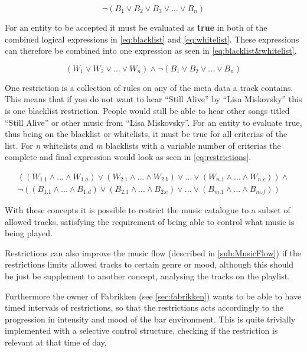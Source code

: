 \begin{equation}
\label{eq:blacklist}
	\neg(B_1 \vee B_2 \vee B_3 \vee ... \vee B_n)
\end{equation}

For an entity to be accepted it must be evaluated as \textbf{true} in both of the combined logical expressions in \cref{eq:blacklist} and \cref{eq:whitelist}. These expressions can therefore be combined into one expression as seen in \cref{eq:blacklist&whitelist}.

\begin{equation}
\label{eq:blacklist&whitelist}
		(W_1 \vee W_2 \vee ... \vee W_n) \wedge \neg(B_1 \vee B_2 \vee ... \vee B_n)
\end{equation}

One restriction is a collection of rules on any of the meta data a track contains. This means that if you do not want to hear \enquote{Still Alive} by \enquote{Lisa Miskovsky} this is one blacklist restriction. People would still be able to hear other songs titled \enquote{Still Alive} or other music from \enquote{Lisa Miskovsky}. For an entity to evaluate true, thus being on the blacklist or whitelists, it must be true for all criterias of the list. For \emph{n} whitelists and \emph{m} blacklists with a variable number of criterias the complete and final expression would look as seen in \cref{eq:restrictions}.

\begin{eqnarray}
	\label{eq:restrictions}
	((W_{1.1} \wedge ... \wedge W_{1.a}) \vee (W_{2.1} \wedge ... \wedge W_{2.b}) \vee ... \vee (W_{n.1} \wedge ... \wedge W_{n.c})) \wedge \nonumber \\ \neg((B_{1.1} \wedge ... \wedge B_{1.d}) \vee (B_{2.1} \wedge ... \wedge B_{2.e}) \vee ... \vee (B_{m.1} \wedge ... \wedge B_{m.f}))
\end{eqnarray}

With these concepts it is possible to restrict the music catalogue to a subset of allowed tracks, satisfying the requirement of being able to control what music is being played.


Restrictions can also improve the music flow (described in \cref{sub:MusicFlow}) if the restrictions limits allowed tracks to certain genre or mood, although this should be just be supplement to another concept, analysing the tracks on the playlist.

Furthermore the owner of Fabrikken (see \cref{sec:fabrikken}) wants to be able to have timed intervals of restrictions, so that the restrictions acts accordingly to the progression in intensity and mood of the bar environment. This is quite trivially implemented with a selective control structure, checking if the restriction is relevant at that time of day.


